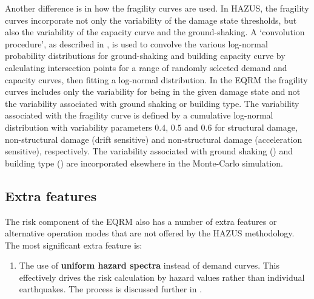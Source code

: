 Another difference is in how the fragility curves are used. In HAZUS, the fragility curves incorporate not only the variability of the damage state
thresholds, but also the variability of the capacity
curve and the ground-shaking. A `convolution
procedure', as described in \cite{dr_Kircher97b}, is used to
convolve the various log-normal probability distributions for
ground-shaking and building capacity curve
by calculating intersection points for a range of randomly
selected demand and capacity curves, then
fitting a log-normal distribution. In the EQRM the fragility
curves includes only the variability for
being in the given damage state and not the variability associated
with ground shaking or building type. The
variability associated with the fragility curve is defined by a cumulative log-normal distribution with
variability parameters $0.4$, $0.5$ and $0.6$ for structural
damage, non-structural damage (drift sensitive) and non-structural
damage (acceleration sensitive), respectively. The variability
associated with ground shaking
() and building
type () are incorporated elsewhere in
the Monte-Carlo simulation.

\subsection{Extra features}

The risk component of the EQRM also has a number of extra features
or alternative operation modes that are not offered by the HAZUS
methodology. The most significant extra feature is:
\begin{enumerate}
\item The use of \textbf{uniform hazard spectra} instead of demand
curves. This effectively drives the risk
calculation by hazard values rather than individual earthquakes.
The process is discussed further in \citet{dr_Patchett04a}. 
\end{enumerate}

